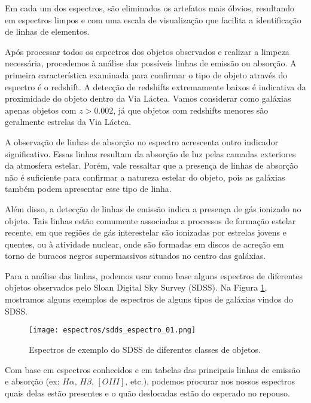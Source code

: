 Em cada um dos espectros, são eliminados os artefatos mais óbvios, resultando em espectros limpos e com uma escala de visualização que facilita a identificação de linhas de elementos.

Após processar todos os espectros dos objetos observados e realizar a limpeza necessária, procedemos à análise das possíveis linhas de emissão ou absorção. A primeira característica examinada para confirmar o tipo de objeto através do espectro é o redshift. A detecção de redshifts extremamente baixos é indicativa da proximidade do objeto dentro da Via Láctea. Vamos considerar como galáxias apenas objetos com $z > 0.002$, já que objetos com redshifts menores são geralmente estrelas da Via Láctea.

A observação de linhas de absorção no espectro acrescenta outro indicador significativo. Essas linhas resultam da absorção de luz pelas camadas exteriores da atmosfera estelar. Porém, vale ressaltar que a presença de linhas de absorção não é suficiente para confirmar a natureza estelar do objeto, pois as galáxias também podem apresentar esse tipo de linha.

Além disso, a detecção de linhas de emissão indica a presença de gás ionizado no objeto. Tais linhas estão comumente associadas a processos de formação estelar recente, em que regiões de gás interestelar são ionizadas por estrelas jovens e quentes, ou à atividade nuclear, onde são formadas em discos de acreção em torno de buracos negros supermassivos situados no centro das galáxias.

Para a análise das linhas, podemos usar como base alguns espectros de diferentes objetos observados pelo Sloan Digital Sky Survey (SDSS). Na Figura \ref{sdds_espectro}, mostramos alguns exemplos de espectros de alguns tipos de galáxias vindos do SDSS.

\begin{figure}[!ht]
    \begin{center}
    \texttt{[image: espectros/sdds\_espectro\_01.png]}
    \caption[]{Espectros de exemplo do SDSS de diferentes classes de objetos.}
    \label{sdds_espectro}
    \end{center}
\end{figure}    

Com base em espectros conhecidos e em tabelas das principais linhas de emissão e absorção (ex: $H\alpha$, $H\beta$, $[OIII]$, etc.), podemos procurar nos nossos espectros quais delas estão presentes e o quão deslocadas estão do esperado no repouso.

